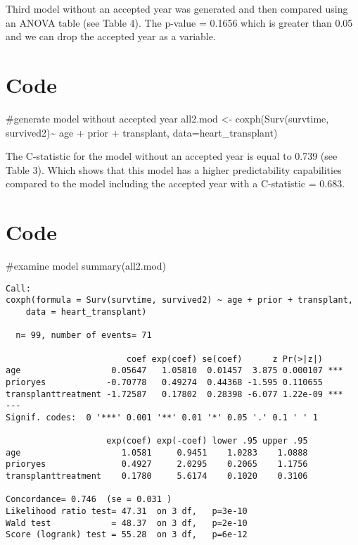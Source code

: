 \documentclass[
  letterpaper,
  DIV=11,
  numbers=noendperiod]{scrreprt}
\newenvironment{Shaded}{\begin{snugshade}}{\end{snugshade}}
\newcommand{\AttributeTok}[1]{\textcolor[rgb]{0.40,0.45,0.13}{#1}}
\newcommand{\CommentTok}[1]{\textcolor[rgb]{0.37,0.37,0.37}{#1}}
\newcommand{\FunctionTok}[1]{\textcolor[rgb]{0.28,0.35,0.67}{#1}}
\newcommand{\NormalTok}[1]{\textcolor[rgb]{0.00,0.23,0.31}{#1}}
\newcommand{\OtherTok}[1]{\textcolor[rgb]{0.00,0.23,0.31}{#1}}
\newcommand{\SpecialCharTok}[1]{\textcolor[rgb]{0.37,0.37,0.37}{#1}}
\begin{document}
Third model without an accepted year was generated and then compared
using an ANOVA table (see Table 4). The p-value = 0.1656 which is
greater than 0.05 and we can drop the accepted year as a variable.

\hypertarget{code-1}{%
\section{Code}\label{code-1}}

\begin{Shaded}
\begin{Highlighting}[]
\CommentTok{\#generate model without accepted year}
\NormalTok{all2.mod }\OtherTok{\textless{}{-}} \FunctionTok{coxph}\NormalTok{(}\FunctionTok{Surv}\NormalTok{(survtime, survived2)}\SpecialCharTok{\textasciitilde{}}\NormalTok{ age }\SpecialCharTok{+}\NormalTok{ prior }\SpecialCharTok{+}\NormalTok{ transplant, }\AttributeTok{data=}\NormalTok{heart\_transplant)}
\end{Highlighting}
\end{Shaded}

The C-statistic for the model without an accepted year is equal to 0.739
(see Table 3). Which shows that this model has a higher predictability
capabilities compared to the model including the accepted year with a
C-statistic = 0.683.

\hypertarget{code-2}{%
\section{Code}\label{code-2}}

\begin{Shaded}
\begin{Highlighting}[]
\CommentTok{\#examine model}
\FunctionTok{summary}\NormalTok{(all2.mod)}
\end{Highlighting}
\end{Shaded}

\begin{verbatim}
Call:
coxph(formula = Surv(survtime, survived2) ~ age + prior + transplant, 
    data = heart_transplant)

  n= 99, number of events= 71 

                        coef exp(coef) se(coef)      z Pr(>|z|)    
age                  0.05647   1.05810  0.01457  3.875 0.000107 ***
prioryes            -0.70778   0.49274  0.44368 -1.595 0.110655    
transplanttreatment -1.72587   0.17802  0.28398 -6.077 1.22e-09 ***
---
Signif. codes:  0 '***' 0.001 '**' 0.01 '*' 0.05 '.' 0.1 ' ' 1

                    exp(coef) exp(-coef) lower .95 upper .95
age                    1.0581     0.9451    1.0283    1.0888
prioryes               0.4927     2.0295    0.2065    1.1756
transplanttreatment    0.1780     5.6174    0.1020    0.3106

Concordance= 0.746  (se = 0.031 )
Likelihood ratio test= 47.31  on 3 df,   p=3e-10
Wald test            = 48.37  on 3 df,   p=2e-10
Score (logrank) test = 55.28  on 3 df,   p=6e-12
\end{verbatim}
\end{document}

